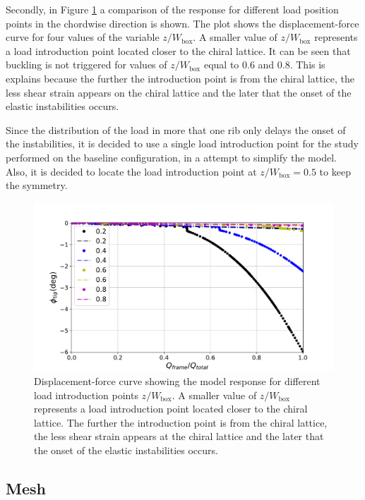     Secondly, in Figure \ref{fig:forceDisplacement-loadZ0coma8} a comparison of the response for different load position points in the chordwise direction is shown. The plot shows the displacement-force curve for four values of the variable $z/W_{\mathrm{box}}$. A smaller value of $z/W_{\mathrm{box}}$ represents a load introduction point located closer to the chiral lattice. It can be seen that buckling is not triggered for values of $z/W_{\mathrm{box}}$ equal to 0.6 and 0.8. This is explains because the further the introduction point is from the chiral lattice, the less shear strain appears on the chiral lattice and the later that the onset of the elastic instabilities occurs. 

    Since the distribution of the load in more that one rib only delays the onset of the instabilities, it is decided to use a single load introduction point for the study performed on the baseline configuration, in a attempt to simplify the model. Also, it is decided to locate the load introduction point at $z/W_{\mathrm{box}} = 0.5$ to keep the symmetry.

    \begin{figure}[!htpb]
      \centering
      \includegraphics[width=0.8 \textwidth]{figures/result-model/forceDisplacement-loadZ0coma8}
      \caption[Displacement-force curve showing the model response for different load introduction points $z/W_{\mathrm{box}}$]{Displacement-force curve showing the model response for different load introduction points $z/W_{\mathrm{box}}$. A smaller value of $z/W_{\mathrm{box}}$ represents a load introduction point located closer to the chiral lattice. The further the introduction point is from the chiral lattice, the less shear strain appears at the chiral lattice and the later that the onset of the elastic instabilities occurs.}
      \label{fig:forceDisplacement-loadZ0coma8}
    \end{figure}

  \clearpage
  \subsection{Mesh} \label{subsec:mesh_results_model}

